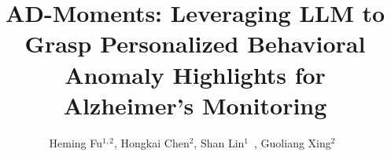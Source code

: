 \documentclass[sigconf, anonymous, 9pt, nonacm]{acmart}
\newcommand{\sys}{AD-Moments\xspace}
\begin{document}
\title{\sys: Leveraging LLM to Grasp Personalized Behavioral Anomaly Highlights for Alzheimer's Monitoring}
\author{Heming Fu$^{1, 2}$, Hongkai Chen$^2$, Shan Lin$^1$~\textsuperscript{\Letter}, Guoliang Xing$^2$~\textsuperscript{\Letter}}

\renewcommand{\shortauthors}{H. Fu et al.}


\newcommand{\revised}[1]{\textcolor{blue}{#1}} %
\newcommand{\data}[1]{\textcolor{red}{#1}} %
\end{document}
